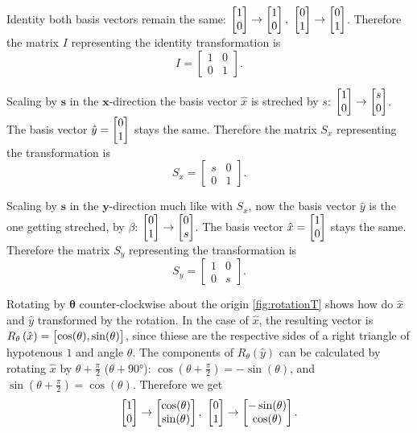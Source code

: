 \begin{descitemize}
	\item[Identity] both basis vectors remain the same: $\colvec{1;0}\to\colvec{1;0},\ \colvec{0;1}\to\colvec{0;1}$. Therefore the matrix $I$ representing the identity transformation is
		\begin{equation}
			I = \begin{bmatrix} 1&0 \\ 0&1 \end{bmatrix}.
		\end{equation}

	\item[Scaling by $\bm{s}$ in the $\bm{x}$-direction] the basis vector $\hat{x}$ is streched by $s$: $\colvec{1;0}\to\colvec{s;0}$. The basis vector $\hat{y}=\colvec{0;1}$ stays the same. Therefore the matrix $S_{x}$ representing the transformation is
		\begin{equation}
			S_{x} = \begin{bmatrix} s&0 \\ 0&1 \end{bmatrix}.
			\label{eq:}
		\end{equation}
	
	\item[Scaling by $\bm{s}$ in the $\bm{y}$-direction] much like with $S_{x}$, now the basis vector $\hat{y}$ is the one getting streched, by $\beta$: $\colvec{0;1}\to\colvec{0;s}$. The basis vector $\hat{x}=\colvec{1;0}$ stays the same. Therefore the matrix $S_{y}$ representing the transformation is
		\begin{equation}
			S_{y} = \begin{bmatrix} 1&0 \\ 0&s \end{bmatrix}.
			\label{eq:}
		\end{equation}

	\item[Rotating by $\bm{\theta}$ counter-clockwise about the origin] \autoref{fig:rotationT} shows how do $\hat{x}$ and $\hat{y}$ transformed by the rotation. In the case of $\hat{x}$, the resulting vector is $R_{\theta} \left( \hat{x} \right)=\colvec{\cos(\theta),\sin(\theta)}$, since thiese are the respective sides of a right triangle of hypotenous $1$ and angle $\theta$. The components of $R_{\theta}\left(\hat{y}\right)$ can be calculated by rotating $\hat{x}$ by $\theta+\frac{\pi}{2}$ ($\theta+\ang{90}$): $\cos \left( \theta+\frac{\pi}{2} \right) = -\sin(\theta)$, and $\sin \left( \theta+\frac{\pi}{2} \right) = \cos \left( \theta \right)$. Therefore we get
		\begin{equation}
			\colvec{1;0} \to \colvec{\cos(\theta);\sin(\theta)},\ \colvec{0;1} \to \colvec{-\sin(\theta);\cos(\theta)}.
			\label{eq:}
		\end{equation}


\end{descitemize}
